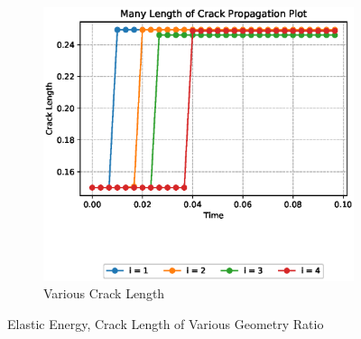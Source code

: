 \documentclass[a4paper,11pt]{article}
\begin{document}
\begin{figure}[h!]
\begin{subfigure}[b]{0.49\linewidth}
		\includegraphics[width=\linewidth]{picture/conference/manycracklength-gvar}
		\caption{Various Crack Length}
		\label{fig:manycracklength-gvar}
	\end{subfigure}
	\caption{Elastic Energy, Crack Length of Various Geometry Ratio}
	\label{fig:gvar}
\end{figure}
\newpage
\end{document}
